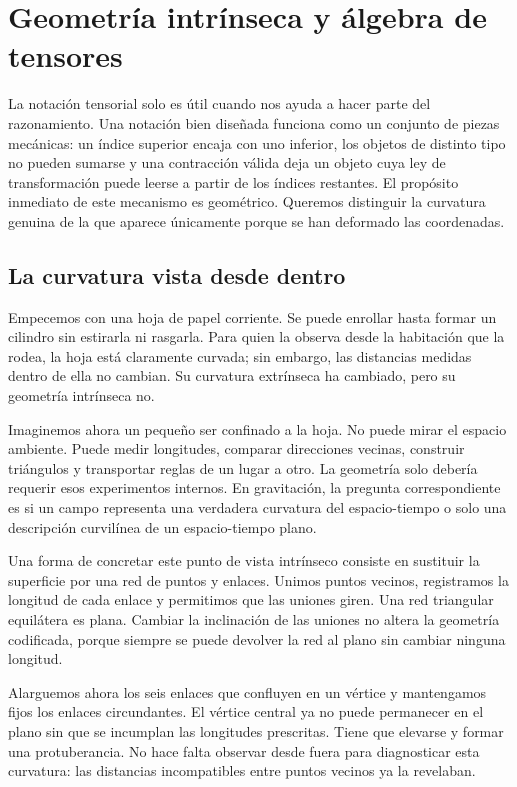 \chapter{Geometría intrínseca y álgebra de tensores}

La notación tensorial solo es útil cuando nos ayuda a hacer parte del razonamiento. Una notación bien diseñada funciona como un conjunto de piezas mecánicas: un índice superior encaja con uno inferior, los objetos de distinto tipo no pueden sumarse y una contracción válida deja un objeto cuya ley de transformación puede leerse a partir de los índices restantes. El propósito inmediato de este mecanismo es geométrico. Queremos distinguir la curvatura genuina de la que aparece únicamente porque se han deformado las coordenadas.

\section{La curvatura vista desde dentro}

Empecemos con una hoja de papel corriente. Se puede enrollar hasta formar un cilindro sin estirarla ni rasgarla. Para quien la observa desde la habitación que la rodea, la hoja está claramente curvada; sin embargo, las distancias medidas dentro de ella no cambian. Su curvatura extrínseca ha cambiado, pero su geometría intrínseca no.

Imaginemos ahora un pequeño ser confinado a la hoja. No puede mirar el espacio ambiente. Puede medir longitudes, comparar direcciones vecinas, construir triángulos y transportar reglas de un lugar a otro. La geometría solo debería requerir esos experimentos internos. En gravitación, la pregunta correspondiente es si un campo representa una verdadera curvatura del espacio-tiempo o solo una descripción curvilínea de un espacio-tiempo plano.

Una forma de concretar este punto de vista intrínseco consiste en sustituir la superficie por una red de puntos y enlaces. Unimos puntos vecinos, registramos la longitud de cada enlace y permitimos que las uniones giren. Una red triangular equilátera es plana. Cambiar la inclinación de las uniones no altera la geometría codificada, porque siempre se puede devolver la red al plano sin cambiar ninguna longitud.

Alarguemos ahora los seis enlaces que confluyen en un vértice y mantengamos fijos los enlaces circundantes. El vértice central ya no puede permanecer en el plano sin que se incumplan las longitudes prescritas. Tiene que elevarse y formar una protuberancia. No hace falta observar desde fuera para diagnosticar esta curvatura: las distancias incompatibles entre puntos vecinos ya la revelaban.

